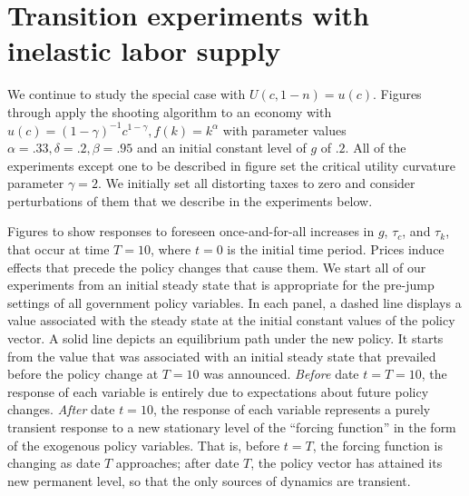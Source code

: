 


\section{Transition experiments with inelastic labor supply}\label{sec:transinelastic}
We continue to study the special case with $U(c,1-n)=u(c)$.
  Figures  through  apply the  %
shooting algorithm to an economy with
$u(c) = (1-\gamma)^{-1} c^{1-\gamma}, f(k) = k^\alpha$
with parameter values $\alpha=.33, \delta = .2,  \beta=.95 $ and an initial
constant level of $g$ of $.2$.  All of the experiments except one to be described in figure  set the critical utility curvature parameter
 $\gamma=2$.   We initially set all distorting taxes to
zero and consider perturbations of them that we describe in the experiments
below.  %

  Figures  to   show responses to foreseen once-and-for-all increases
in $g$, $\tau_c$,  and $\tau_k$, that occur at time
$T=10$, where $t=0$ is the initial time period.  Prices induce
effects that precede the policy changes that cause them. We start
all of our experiments from an initial steady state that is
appropriate for the pre-jump settings of all government policy
variables. In each panel, a dashed line displays a value
associated with the steady state at the initial constant values of
the policy vector. A solid line depicts an equilibrium path under
the new policy. It starts from the value that was associated with
an initial steady state that prevailed before the policy change at
$T=10$ was announced.  {\it Before\/} date $t= T= 10$, the
response of each variable is entirely due to expectations about
future policy changes. {\it After\/} date $t=10$, the response of
each variable represents a purely transient response to a new
stationary level of the ``forcing function'' in the form of the
exogenous policy variables. That is, before  $t=T$, the forcing
function is changing as date $T$ approaches; after date $T$, the
policy vector has attained its new permanent level, so that the
only sources of dynamics are transient.

